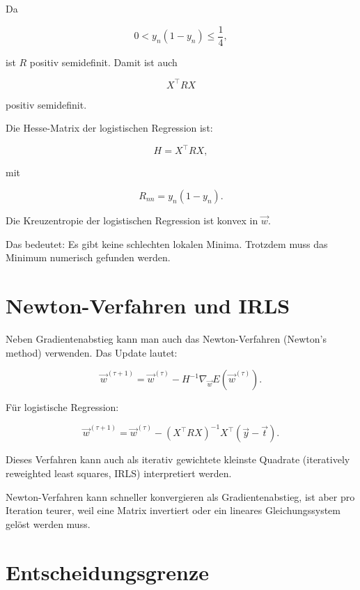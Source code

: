 Da

\[
    0 < y_n(1-y_n) \leq \frac{1}{4},
\]

ist \(R\) positiv semidefinit.
Damit ist auch

\[
    X^{\top}RX
\]

positiv semidefinit.

\begin{definitionbox}
Die Hesse-Matrix der logistischen Regression ist:

\[
    H
    =
    X^{\top}RX,
\]

mit

\[
    R_{nn}
    =
    y_n(1-y_n).
\]
\end{definitionbox}

\begin{conceptbox}
Die Kreuzentropie der logistischen Regression ist konvex in \(\vec{w}\).

Das bedeutet:
Es gibt keine schlechten lokalen Minima.
Trotzdem muss das Minimum numerisch gefunden werden.
\end{conceptbox}

\section{Newton-Verfahren und IRLS}

Neben Gradientenabstieg kann man auch das Newton-Verfahren (Newton's method) verwenden.
Das Update lautet:

\[
    \vec{w}^{(\tau+1)}
    =
    \vec{w}^{(\tau)}
    -
    H^{-1}
    \nabla_{\vec{w}}E(\vec{w}^{(\tau)}).
\]

Für logistische Regression:

\[
    \vec{w}^{(\tau+1)}
    =
    \vec{w}^{(\tau)}
    -
    (X^{\top}RX)^{-1}
    X^{\top}(\vec{y}-\vec{t}).
\]

Dieses Verfahren kann auch als iterativ gewichtete kleinste Quadrate (iteratively reweighted least squares, IRLS) interpretiert werden.

\begin{notebox}
Newton-Verfahren kann schneller konvergieren als Gradientenabstieg, ist aber pro Iteration teurer, weil eine Matrix invertiert oder ein lineares Gleichungssystem gelöst werden muss.
\end{notebox}

\section{Entscheidungsgrenze}

